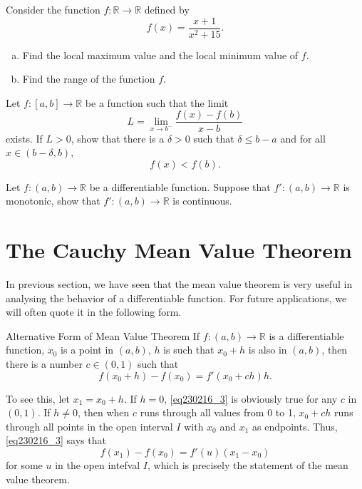 \atc
\begin{question}{\themyquestion}
Consider the function $f:\mathbb{R}\to\mathbb{R}$ defined by
\[f(x)=\frac{x+1}{x^2+15}.\]
\begin{enumerate}[(a)]
\item 
Find the local maximum value and the local minimum value of $f$.
\item Find the range of the function $f$. 
\end{enumerate}
\end{question}

\atc
\begin{question}{\themyquestion}
Let $f:[a, b]\to \mathbb{R}$ be a function such that the limit 
\[L=\lim_{x\to b^-}\frac{f(x)-f(b)}{x-b} \]
 exists. If $L>0$, show that there is a $\delta>0$ such that $\delta\leq b-a$ and for all $x\in (b-\delta, b)$,
\[f(x)<f(b).\]

\end{question}

\atc
\begin{question}{\themyquestion}
Let $f:(a, b)\to \mathbb{R}$ be a differentiable function. Suppose that $f':(a,b)\to\mathbb{R}$ is monotonic, show that $f':(a,b)\to\mathbb{R}$ is continuous.

\end{question}
\vp
\section{The Cauchy Mean Value Theorem}\label{sec3.4}
In previous section, we have seen that the mean value theorem is very useful in analysing the behavior of a differentiable function. For future applications, we will often quote it in the following form.
\begin{highlight}{Alternative Form of Mean Value Theorem} If $f:(a, b)\to \mathbb{R}$ is a differentiable function, $x_0$ is a point in $(a, b)$, $h$ is such that $x_0+h$ is also in $(a, b)$, then there is a number $c\in (0,1)$ such that 
\begin{equation}\label{eq230216_3}f(x_0+h)-f(x_0)=f'(x_0+ch)h.\end{equation}
\end{highlight}
To see this, let $x_1=x_0+h$.  If $h=0$, \eqref{eq230216_3} is obviously true for any $c$ in $(0, 1)$. If $h\neq 0$, then when $c$ runs through all values from 0 to 1, $x_0+ch$ runs through all points in the open interval  $I$ with $x_0$ and $x_1$ as endpoints. Thus, \eqref{eq230216_3} says that
\[ f(x_1)-f(x_0)=f'(u)(x_1-x_0)\] for some $u$ in the open intefval $I$, which is precisely the statement of the mean value theorem.

